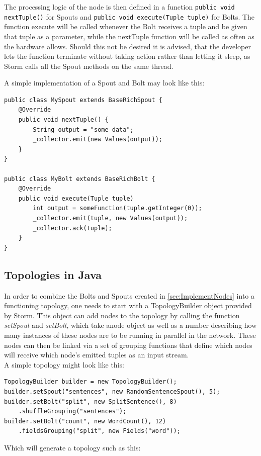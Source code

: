 \documentclass[12pt,a4paper]{article}
\begin{document}
The processing logic of the node is then defined in a function \lstinline$public void$\\
\lstinline$nextTuple()$ for Spouts and \lstinline$public void execute(Tuple tuple)$ for Bolts. The function execute will be called whenever the Bolt receives a tuple and be given that tuple as a parameter, while the nextTuple function will be called as often as the hardware allows. Should this not be desired it is advised, that the developer lets the function terminate without taking action rather than letting it sleep, as Storm calls all the Spout methods on the same thread.

A simple implementation of a Spout and Bolt may look like this:
\begin{lstlisting}
public class MySpout extends BaseRichSpout {
    @Override
    public void nextTuple() {
        String output = "some data";
        _collector.emit(new Values(output));
    }
}

public class MyBolt extends BaseRichBolt {
    @Override
    public void execute(Tuple tuple)
        int output = someFunction(tuple.getInteger(0));
        _collector.emit(tuple, new Values(output));
        _collector.ack(tuple);
    }
}
\end{lstlisting}
\subsection{Topologies in Java}
\label{sec:ImplementTopology}
In order to combine the Bolts and Spouts created in \ref{sec:ImplementNodes} into a functioning topology, one needs to start with a TopologyBuilder object provided by Storm. This object can add nodes to the topology by calling the function \textit{setSpout} and \textit{setBolt}, which take anode object as well as a number describing how many instances of these nodes are to be running in parallel in the network. These nodes can then be linked via a set of grouping functions that define which nodes will receive which node's emitted tuples as an input stream.\\

A simple topology might look like this:
\begin{lstlisting}
TopologyBuilder builder = new TopologyBuilder();
builder.setSpout("sentences", new RandomSentenceSpout(), 5);
builder.setBolt("split", new SplitSentence(), 8)
    .shuffleGrouping("sentences");
builder.setBolt("count", new WordCount(), 12)
    .fieldsGrouping("split", new Fields("word"));
\end{lstlisting}
Which will generate a topology such as this:\\
\end{document}
